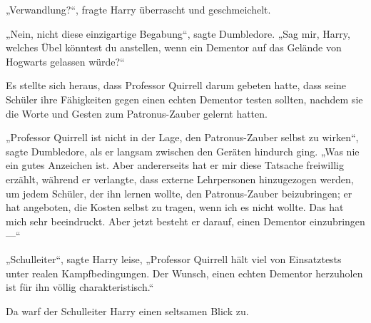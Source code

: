„Verwandlung?“, fragte Harry überrascht und geschmeichelt.

„Nein, nicht diese einzigartige Begabung“, sagte Dumbledore.
„Sag mir, Harry, welches Übel könntest du anstellen, wenn ein Dementor auf das Gelände von Hogwarts gelassen würde?“

\later

Es stellte sich heraus, dass Professor Quirrell darum gebeten hatte, dass seine Schüler ihre Fähigkeiten gegen einen echten Dementor testen sollten, nachdem sie die Worte und Gesten zum Patronus-Zauber gelernt hatten.

„Professor Quirrell ist nicht in der Lage, den Patronus-Zauber selbst zu wirken“, sagte Dumbledore, als er langsam zwischen den Geräten hindurch ging.
„Was nie ein gutes Anzeichen ist. Aber andererseits hat er mir diese Tatsache freiwillig erzählt, während er verlangte, dass externe Lehrpersonen hinzugezogen werden, um jedem Schüler, der ihn lernen wollte, den Patronus-Zauber beizubringen; er hat angeboten, die Kosten selbst zu tragen, wenn ich es nicht wollte. Das hat mich sehr beeindruckt. Aber jetzt besteht er darauf, einen Dementor einzubringen —“

„Schulleiter“, sagte Harry leise,
„Professor Quirrell hält viel von Einsatztests unter realen Kampfbedingungen. Der Wunsch, einen echten Dementor herzuholen ist für ihn völlig charakteristisch.“

Da warf der Schulleiter Harry einen seltsamen Blick zu.

